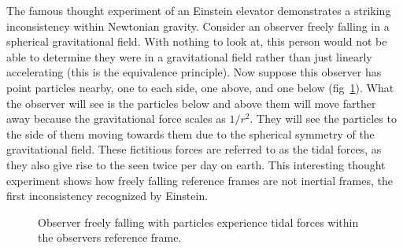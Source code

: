 The famous thought experiment of an Einstein elevator demonstrates a striking inconsistency within Newtonian gravity. Consider an observer freely falling in a spherical gravitational field. With nothing to look at, this person would not be able to determine they were in a gravitational field rather than just linearly accelerating (this is the equivalence principle). Now suppose this observer has point particles nearby, one to each side, one above, and one below (fig~\ref{fig:tidal_forces}). What the observer will see is the particles below and above them will move farther away because the gravitational force scales as $1/r^2$. They will see the particles to the side of them moving towards them due to the spherical symmetry of the gravitational field. These fictitious forces are referred to as the tidal forces, as they also give rise to the seen twice per day on earth. This interesting thought experiment shows how freely falling reference frames are not inertial frames, the first inconsistency recognized by Einstein. 
\begin{figure}
    \centering
    \caption{Observer freely falling with particles experience tidal forces within the observers reference frame.}
    \label{fig:tidal_forces}
\end{figure}

